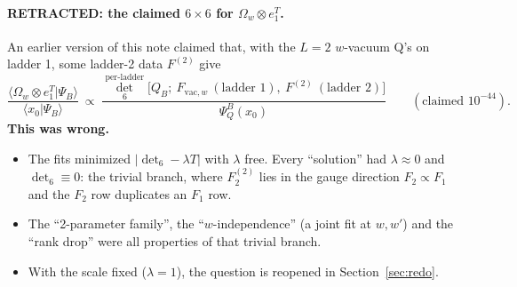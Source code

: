 \documentclass[11pt]{article}
\newcommand{\Om}{\Omega}
\newcommand{\vac}{\mathrm{vac}}
\begin{document}
\paragraph{RETRACTED: the claimed $6\times6$ for $\Om_w\otimes e_1^T$.} An earlier version of this note claimed that, with the $L=2$ $w$-vacuum Q's on ladder 1, some ladder-2 data $F^{(2)}$ give
\[
\frac{\langle\Om_w\otimes e_1^T|\Psi_B\rangle}{\langle x_0|\Psi_B\rangle}\ \propto\ \frac{\det_6^{\text{per-ladder}}\big[Q_B;\ F_{\vac,w}\ (\text{ladder }1),\ F^{(2)}\ (\text{ladder }2)\big]}{\Psi_Q^B(x_0)}\qquad(\text{claimed }10^{-44}).
\]
\textbf{This was wrong.}
\begin{itemize}
\item The fits minimized $|\det_6-\lambda T|$ with $\lambda$ free. Every ``solution'' had $\lambda\approx0$ and $\det_6\equiv0$: the trivial branch, where $F_2^{(2)}$ lies in the gauge direction $F_2\propto F_1$ and the $F_2$ row duplicates an $F_1$ row.
\item The ``2-parameter family'', the ``$w$-independence'' (a joint fit at $w,w'$) and the ``rank drop'' were all properties of that trivial branch.
\item With the scale fixed ($\lambda=1$), the question is reopened in Section~\ref{sec:redo}.
\end{itemize}
\end{document}
